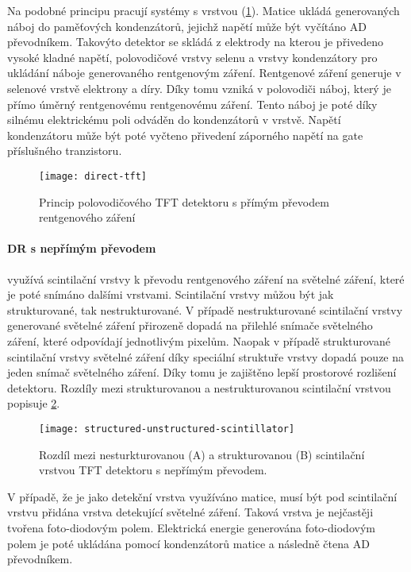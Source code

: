 Na podobné principu pracují systémy s vrstvou  (\cref{fig:direct-tft}). Matice  ukládá generovaných náboj do paměťových kondenzátorů, jejichž napětí může být vyčítáno AD převodníkem. Takovýto detektor se skládá z elektrody na kterou je přivedeno vysoké kladné napětí, polovodičové vrstvy selenu a vrstvy  kondenzátory pro ukládání náboje generovaného rentgenovým záření. Rentgenové záření generuje v selenové vrstvě elektrony a díry. Díky tomu vzniká v polovodiči náboj, který je přímo úměrný rentgenovému rentgenovému záření. Tento náboj je poté díky silnému elektrickému poli odváděn do kondenzátorů v  vrstvě. Napětí kondenzátoru může být poté vyčteno přivedení záporného napětí na gate příslušného tranzistoru.

\begin{figure}[ht]
\centering
\texttt{[image: direct-tft]}
\caption{Princip polovodičového TFT detektoru s přímým převodem rentgenového záření \cite[str.~511]{Radiation-Detection-and-Measurement}}
\label{fig:direct-tft}
\end{figure}

\paragraph{DR s nepřímým převodem}
využívá scintilační vrstvy k převodu rentgenového záření na světelné záření, které je poté snímáno dalšími vrstvami. Scintilační vrstvy můžou být jak strukturované, tak nestrukturované. V případě nestrukturované scintilační vrstvy generované světelné záření přirozeně dopadá na přilehlé snímače světelného záření, které odpovídají jednotlivým pixelům. Naopak v případě strukturované scintilační vrstvy světelné záření díky speciální struktuře vrstvy dopadá pouze na jeden snímač světelného záření. Díky tomu je zajištěno lepší prostorové rozlišení detektoru. Rozdíly mezi strukturovanou a nestrukturovanou scintilační vrstvou popisuje \cref{fig:structured-unstructured-scintillator}.

\begin{figure}[ht]
\centering
\texttt{[image: structured-unstructured-scintillator]}
\caption{Rozdíl mezi nesturkturovanou (A) a strukturovanou (B) scintilační vrstvou TFT detektoru s nepřímým převodem. \cite[str~210]{Diagnostic-Radiology}}
\label{fig:structured-unstructured-scintillator}
\end{figure}

V případě, že je jako detekční vrstva využíváno  matice, musí být pod scintilační vrstvu přidána vrstva detekující světelné záření. Taková vrstva je nejčastěji tvořena foto-diodovým polem. Elektrická energie generována foto-diodovým polem je poté ukládána pomocí kondenzátorů  matice a následně  čtena AD převodníkem.

